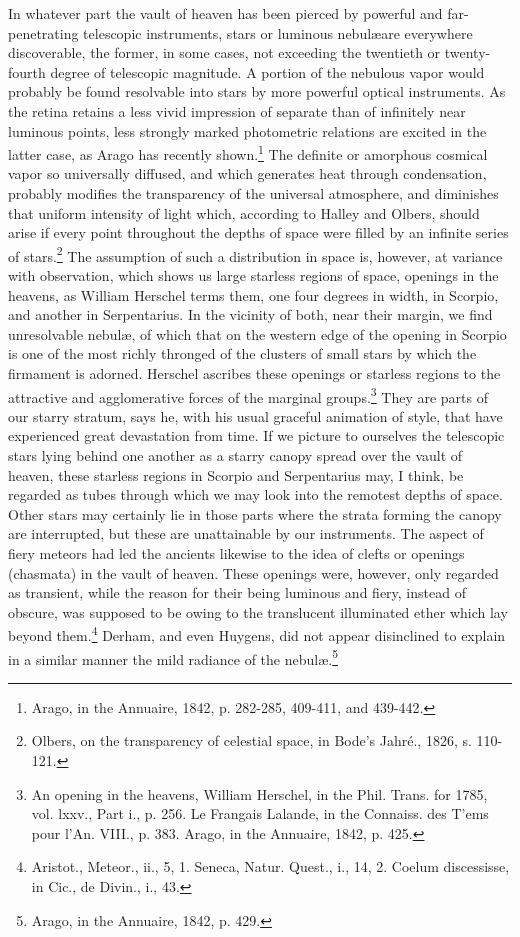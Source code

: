 In whatever part the vault of heaven has been pierced by powerful and far-penetrating telescopic instruments, stars or luminous nebul\ae are everywhere discoverable, the former, in some cases, not exceeding the twentieth or twenty-fourth degree of telescopic magnitude. A portion of the nebulous vapor would probably be found resolvable into stars by more powerful optical instruments. As the retina retains a less vivid impression of separate than of infinitely near luminous points, less strongly marked photometric relations are excited in the latter case, as Arago has recently shown.\footnote{Arago, in the Annuaire, 1842, p. 282-285, 409-411, and 439-442.} The definite or amorphous cosmical vapor so universally diffused, and which generates heat through condensation, probably modifies the transparency of the universal atmosphere, and diminishes that uniform intensity of light which, according to Halley and Olbers, should arise if every point throughout the depths of space were filled by an infinite series of stars.\footnote{Olbers, on the transparency of celestial space, in Bode's Jahr\'{e}., 1826, s. 110-121.} The assumption of such a distribution in space is, however, at variance with observation, which shows us large starless regions of space, openings in the heavens, as William Herschel terms them, one four degrees in width, in Scorpio, and another in Serpentarius. In the vicinity of both, near their margin, we find unresolvable nebul\ae, of which that on the western edge of the opening in Scorpio is one of the most richly thronged of the clusters of small stars by which the firmament is adorned. Herschel ascribes these openings or starless regions to the attractive and agglomerative forces of the marginal groups.\footnote{An opening in the heavens, William Herschel, in the Phil. Trans. for 1785, vol. lxxv., Part i., p. 256. Le Frangais Lalande, in the Connaiss. des T'ems pour l'An. VIII., p. 383. Arago, in the Annuaire, 1842, p. 425.} They are parts of our starry stratum, says he, with his usual graceful animation of style, that have experienced great devastation from time. If we picture to ourselves the telescopic stars lying behind one another as a starry canopy spread over the vault of heaven, these starless regions in Scorpio and Serpentarius may, I think, be regarded as tubes through which we may look into the remotest depths of space. Other stars may certainly lie in those parts where the strata forming the canopy are interrupted, but these are unattainable by our instruments. The aspect of fiery meteors had led the ancients likewise to the idea of clefts or openings (chasmata) in the vault of heaven. These openings were, however, only regarded as transient, while the reason for their being luminous and fiery, instead of obscure, was supposed to be owing to the translucent illuminated ether which lay beyond them.\footnote{Aristot., Meteor., ii., 5, 1. Seneca, Natur. Quest., i., 14, 2. Coelum discessisse, in Cic., de Divin., i., 43.} Derham, and even Huygens, did not appear disinclined to explain in a similar manner the mild radiance of the nebul\ae.\footnote{Arago, in the Annuaire, 1842, p. 429.}
